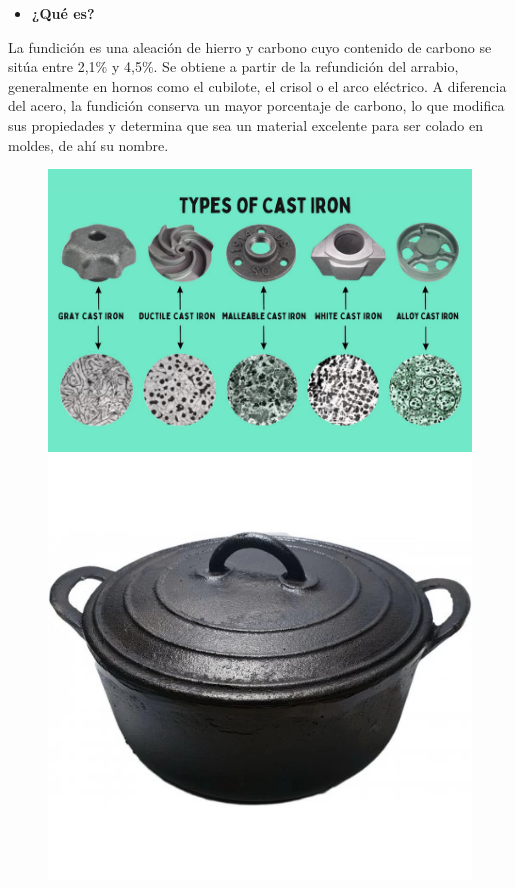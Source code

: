 \documentclass[12pt,a4paper]{article}
\begin{document}
\begin{itemize}
    \item \textbf{¿Qué es?}
\end{itemize}

 La fundición es una aleación de hierro y carbono cuyo contenido de carbono se sitúa entre 2,1\% y 4,5\%. Se obtiene a partir de la refundición del arrabio, generalmente en hornos como el cubilote, el crisol o el arco eléctrico. A diferencia del acero, la fundición conserva un mayor porcentaje de carbono, lo que modifica sus propiedades y determina que sea un material excelente para ser colado en moldes, de ahí su nombre.

\begin{figure}[H]
    \centering
    \begin{minipage}{0.47\textwidth}
        \centering
        \includegraphics[width=\textwidth]{Inagenes para latex/Fundicion.png}
    \end{minipage}
    \begin{minipage}{0.47\textwidth}
        \centering
        \includegraphics[width=\textwidth]{Inagenes para latex/fundicion 4.png}
    \end{minipage}
\end{figure}
 
\end{document}
